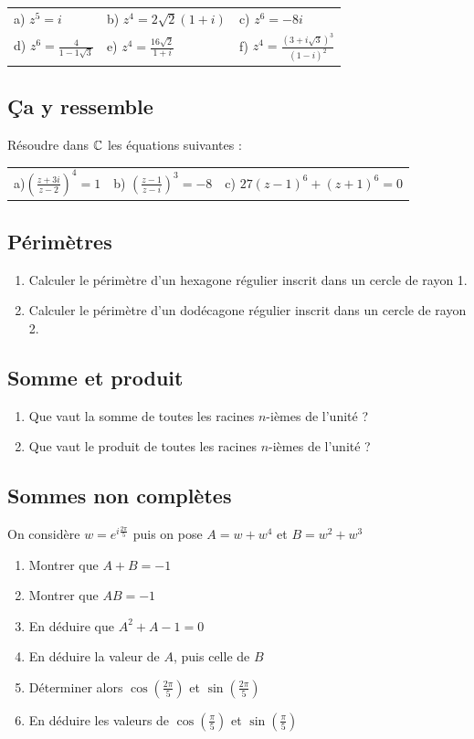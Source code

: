 \documentclass[oneside,12pt]{book}          %
\begin{document}
\begin{tabular}{p{} p{} p{}}
    a) $z^5=i$ & b) $z^4=2\sqrt{2}(1+i)$ & c)  $z^6=-8i$ \\
    d) $z^6=\frac{4}{1-1\sqrt{3}}$ & e) $z^4=\frac{16\sqrt{2}}{1+i}$ & f) $z^4=\frac{(3+i\sqrt{3})^3}{(1-i)^2}$
\end{tabular}


\subsection{Ça y ressemble}
Résoudre dans ${\mathbb C}$ les équations suivantes :

\begin{tabular}{p{} p{} p{}}
    a)$\left(\frac{z+3i}{z-2}\right)^4=1$ & b) $\left(\frac{z-1}{z-i}\right)^3=-8$  & c) $27(z-1)^6+(z+1)^6=0$
\end{tabular}


\subsection{Périmètres}
\begin{enumerate}
    \item Calculer le périmètre d'un hexagone régulier inscrit dans un cercle de rayon 1.
    \item Calculer le périmètre d'un dodécagone régulier inscrit dans un cercle de rayon 2.
\end{enumerate}



\subsection{Somme et produit}
\begin{enumerate}
	\item Que vaut la somme de toutes les racines $n$-ièmes de l'unité ?
	\item Que vaut le produit de toutes les racines $n$-ièmes de l'unité ?
\end{enumerate}



\subsection{Sommes non complètes}
On considère $w=e^{i\frac{2\pi}{5}}$ puis on pose $A=w+w^4$ et $B=w^2+w^3$
\begin{enumerate}
	\item Montrer que $A+B=-1$
	\item Montrer que $AB=-1$
	\item En déduire que $A^2+A-1=0$
	\item En déduire la valeur de $A$, puis celle de $B$
	\item Déterminer alors $\cos\left(\frac{2\pi}{5}\right)$ et $\sin\left(\frac{2\pi}{5}\right)$
	\item En déduire les valeurs de $\cos\left(\frac{\pi}{5}\right)$ et $\sin\left(\frac{\pi}{5}\right)$
\end{enumerate}
\end{document}
